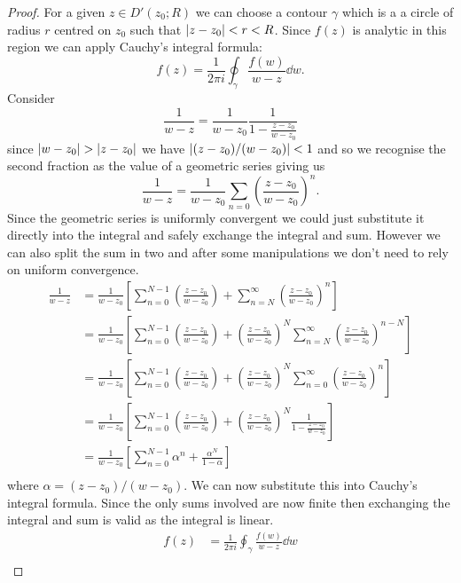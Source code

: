 \documentclass{article}
\newcommand{\discPunctured}[2]{D'\left({#1}; {#2}\right)}
\begin{document}
    \begin{proof}
        For a given \(z\in\discPunctured{z_0}{R}\) we can choose a contour \(\gamma\) which is a a circle of radius \(r\) centred on \(z_0\) such that \(\abs{z - z_0} < r < R\).
        Since \(f(z)\) is analytic in this region we can apply Cauchy's integral formula:
        \[f(z) = \frac{1}{2\pi i}\oint_{\gamma} \frac{f(w)}{w - z}\dd{w}.\]
        Consider
        \[\frac{1}{w - z} = \frac{1}{w - z_0}\frac{1}{1 - \frac{z - z_0}{w - z_0}}\]
        since \(\abs{w - z_0} > \abs{z - z_0}\) we have \(\abs{(z - z_0)/(w - z_0)} < 1\) and so we recognise the second fraction as the value of a geometric series giving us
        \[\frac{1}{w - z} = \frac{1}{w - z_0} \sum_{n=0}\left(\frac{z - z_0}{w - z_0}\right)^n.\]
        Since the geometric series is uniformly convergent we could just substitute it directly into the integral and safely exchange the integral and sum.
        However we can also split the sum in two and after some manipulations we don't need to rely on uniform convergence.
        \begin{align*}
            \frac{1}{w - z} &= \frac{1}{w - z_0} \left[\sum_{n=0}^{N-1} \left(\frac{z - z_0}{w - z_0}\right) + \sum_{n=N}^{\infty}\left(\frac{z-z_0}{w - z_0}\right)^n\right]\\
            &= \frac{1}{w - z_0} \left[\sum_{n=0}^{N-1} \left(\frac{z - z_0}{w - z_0}\right) + \left(\frac{z - z_0}{w  - z_0}\right)^N\sum_{n=N}^{\infty}\left(\frac{z-z_0}{w - z_0}\right)^{n-N}\right]\\
            &= \frac{1}{w - z_0} \left[\sum_{n=0}^{N-1} \left(\frac{z - z_0}{w - z_0}\right) + \left(\frac{z - z_0}{w  - z_0}\right)^N\sum_{n=0}^{\infty}\left(\frac{z-z_0}{w - z_0}\right)^n\right]\\
            &= \frac{1}{w - z_0} \left[\sum_{n=0}^{N-1} \left(\frac{z - z_0}{w - z_0}\right) + \left(\frac{z - z_0}{w  - z_0}\right)^N\frac{1}{1 - \frac{z - z_0}{w - z_0}}\right]\\
            &= \frac{1}{w - z_0} \left[\sum_{n=0}^{N-1} \alpha^n + \frac{\alpha^N}{1 - \alpha}\right]\\
        \end{align*}
        where \(\alpha = (z - z_0)/(w - z_0)\).
        We can now substitute this into Cauchy's integral formula.
        Since the only sums involved are now finite then exchanging the integral and sum is valid as the integral is linear.
        \begin{align*}
            f(z) &= \frac{1}{2\pi i} \oint_{\gamma} \frac{f(w)}{w - z} \dd{w}\\

\end{align*}
\end{proof}
\end{document}
